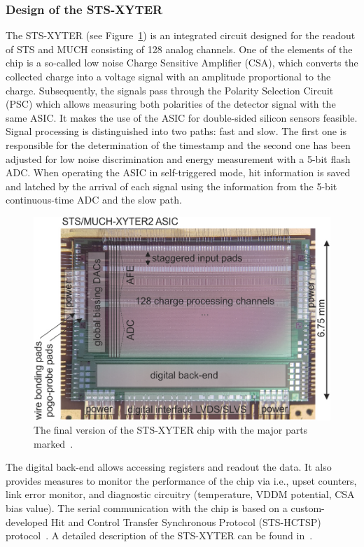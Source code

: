\subsubsection{Design of the STS-XYTER}

The STS-XYTER (see Figure~\ref{sts_xyter}) is an integrated circuit designed for the readout of \gls{STS} and \gls{MUCH} consisting of 128 analog channels. One of the elements of the chip is a so-called low noise Charge Sensitive Amplifier (\gls{CSA}), which converts the collected charge into a voltage signal with an amplitude proportional to the charge. Subsequently, the signals pass through the Polarity Selection Circuit (\gls{PSC}) which allows measuring both polarities
  of the detector signal with the same \gls{ASIC}. It makes the use of the \gls{ASIC} for double-sided silicon sensors feasible. Signal processing is distinguished into two paths: fast and slow. The first one is responsible for the determination of the timestamp and the second one has been adjusted for low noise discrimination and energy measurement with a 5-bit flash \gls{ADC}. When operating the \gls{ASIC} in self-triggered mode, hit information is saved and latched by the arrival of each signal using the information from the 5-bit continuous-time \gls{ADC} and the slow path. 

\begin{figure}[!h]
\centering
\includegraphics[width=0.65\columnwidth]{Chapter2/images/ASIC2.2.png}
\caption{The final version of the STS-XYTER chip with the major parts marked~\cite{KASINSKI2018225}.}
\label{sts_xyter}
\end{figure}

The digital back-end allows accessing registers and readout the data. It also provides measures to monitor the performance of the chip via i.e., upset counters, link error monitor, and diagnostic circuitry (temperature, VDDM potential, CSA bias value). The serial communication with the chip is based on a custom-developed Hit and Control Transfer Synchronous Protocol (STS-HCTSP) protocol~\cite{Kasinski_2016}. A detailed description of the STS-XYTER can be found in~\cite{RodriguezRodriguez2020}.

